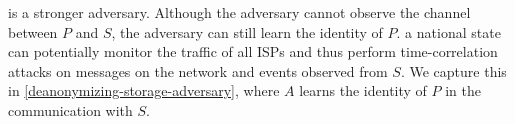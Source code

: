  is a stronger adversary.
Although the adversary cannot observe the channel between \(P\) and \(S\), the 
adversary can still learn the identity of \(P\).
\Eg a national state can potentially monitor the traffic of all \acp{ISP} and 
thus perform time-correlation attacks on messages on the network and events 
observed from \(S\).
We capture this in \cref{deanonymizing-storage-adversary}, where \(A\) learns 
the identity of \(P\) in the communication with \(S\).

